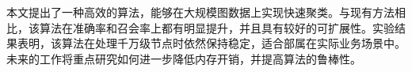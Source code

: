 本文提出了一种高效的算法，能够在大规模图数据上实现快速聚类。与现有方法相比，该算法在准确率和召会率上都有明显提升，并且具有较好的可扩展性。实验结果表明，该算法在处理千万级节点时依然保持稳定，适合部属在实际业务场景中。未来的工作将重点研究如何进一步降低内存开销，并提高算法的鲁棒性。
